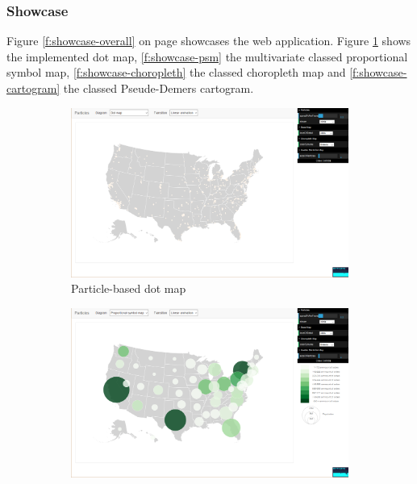 \subsubsection{Showcase}
Figure \ref{f:showcase-overall} on page \pageref{f:showcase-overall} showcases the web application. Figure \ref{f:showcase-dot} shows the implemented dot map, \ref{f:showcase-psm} the multivariate classed proportional symbol map, \ref{f:showcase-choropleth} the classed choropleth map and \ref{f:showcase-cartogram} the classed Pseude-Demers cartogram.

\begin{figure}
    \centering
    \begin{subfigure}[b]{0.475\textwidth}
        \centering
        \includegraphics[width=\textwidth]{images/results/map_dot.png}
        \caption[Particle-based dot map]%
        {{\small Particle-based dot map}}
        \label{f:showcase-dot}
    \end{subfigure}
    \hfill
    \begin{subfigure}[b]{0.475\textwidth}
        \centering
        \includegraphics[width=\textwidth]{images/results/map_psm.png}

\end{subfigure}
\end{figure}
